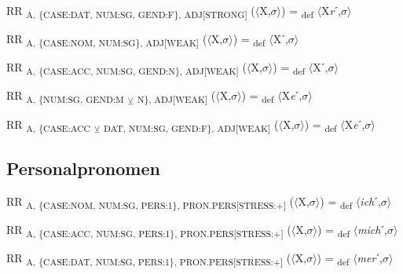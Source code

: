 {\begin{exe}
 RR \textsubscript{A, \{CASE:DAT, NUM:SG, GEND:F\}, ADJ[STRONG]} ($\langle$X,$\sigma $$\rangle$) = \textsubscript{def} $\langle$X\textit{r}ˊ,$\sigma $$\rangle$
\end{exe}

\begin{exe}
 RR \textsubscript{A, \{CASE:NOM, NUM:SG\}, ADJ[WEAK]} ($\langle$X,$\sigma $$\rangle$) = \textsubscript{def} $\langle$Xˊ,$\sigma $$\rangle$
\end{exe}

\begin{exe}
 RR \textsubscript{A, \{CASE:ACC, NUM:SG, GEND:N\}, ADJ[WEAK]} ($\langle$X,$\sigma $$\rangle$) = \textsubscript{def} $\langle$Xˊ,$\sigma $$\rangle$
\end{exe}

\begin{exe}
 RR \textsubscript{A, \{NUM:SG, GEND:M} \textsubscript{${\veebar}$}\textsubscript{ N\}, ADJ[WEAK]} ($\langle$X,$\sigma $$\rangle$) = \textsubscript{def} $\langle$X\textit{e}ˊ,$\sigma $$\rangle$
\end{exe}

\begin{exe}
 RR \textsubscript{A, \{CASE:ACC} \textsubscript{${\veebar}$}\textsubscript{ DAT, NUM:SG, GEND:F\}, ADJ[WEAK]} ($\langle$X,$\sigma $$\rangle$) = \textsubscript{def} $\langle$X\textit{e}ˊ,$\sigma $$\rangle$
\end{exe}

\subsection{Personalpronomen}

\begin{exe}
 RR \textsubscript{A, \{CASE:NOM, NUM:SG, PERS:1\}, PRON.PERS[STRESS:+]} ($\langle$X,$\sigma $$\rangle$) = \textsubscript{def} $\langle$\textit{ich}ˊ,$\sigma $$\rangle$
\end{exe}

\begin{exe}
 RR \textsubscript{A, \{CASE:ACC, NUM:SG, PERS:1\}, PRON.PERS[STRESS:+]} ($\langle$X,$\sigma $$\rangle$) = \textsubscript{def} $\langle$\textit{mich}ˊ,$\sigma $$\rangle$
\end{exe}

\begin{exe}
 RR \textsubscript{A, \{CASE:DAT, NUM:SG, PERS:1\}, PRON.PERS[STRESS:+]} ($\langle$X,$\sigma $$\rangle$) = \textsubscript{def} $\langle$\textit{mer}ˊ,$\sigma $$\rangle$
\end{exe}

}
